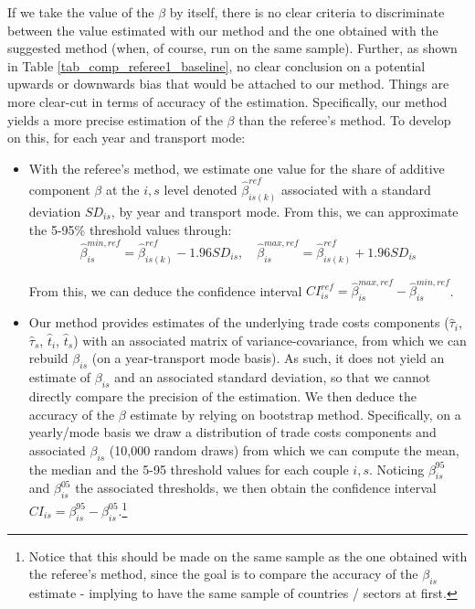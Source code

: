 \documentclass[a4paper,11pt]{article}
\begin{document}
\begin{itemize}
If we take the value of the $\beta$ by itself, there is no clear criteria to discriminate between the value estimated with our method and the one obtained with the suggested method (when, of course, run on the same sample). Further, as shown in Table \ref{tab_comp_referee1_baseline}, no clear conclusion on a potential upwards or downwards bias that would be attached to our method. Things are more clear-cut in terms of accuracy of the estimation. Specifically, our method yields a more precise estimation of the $\beta$ than the referee's method. To develop on this, for each year and transport mode:
    \begin{itemize}
    \item With the referee's method, we estimate one value for the share of additive component $\beta$ at the $i,s$ level denoted $\hat{\beta}^{ref}_{is(k)}$ associated with a standard deviation $SD_{is}$, by year and transport mode. From this, we can approximate the 5-95\% threshold values through:
        $$\hat{\beta}_{is}^{min,ref} = \hat{\beta}^{ref}_{is(k)} - 1.96 SD_{is},\quad \hat{\beta}_{is}^{max,ref} = \hat{\beta}^{ref}_{is(k)} + 1.96 SD_{is}$$

        From this, we can deduce the confidence interval $CI^{ref}_{is} = \hat{\beta}_{is}^{max,ref} - \hat{\beta}_{is}^{min,ref}$.

        \item  Our method provides estimates of the underlying trade costs components ($\widehat{\tau}_i$, $\widehat{\tau}_s$, $\widehat{t}_i$, $\widehat{t}_s$) with an associated matrix of variance-covariance, from which we can rebuild $\beta_{is}$ (on a year-transport mode basis). As such, it does not yield an estimate of $\beta_{is}$ and an associated standard deviation, so that we cannot directly compare the precision of the estimation. We then deduce the accuracy of the $\beta$ estimate by relying on bootstrap method. Specifically, on a yearly/mode basis we draw a distribution of trade costs components and associated $\beta_{is}$ (10,000 random draws) from which we can compute the mean, the median and the 5-95 threshold values for each couple $i,s$. Noticing $\beta_{is}^{95}$ and $\beta_{is}^{05}$ the associated thresholds, we then obtain the confidence interval $CI_{is}= \beta_{is}^{95}- \beta_{is}^{05}$.\footnote{Notice that this should be made on the same sample as the one obtained with the referee's method, since the goal is to compare the accuracy of the $\beta_{is}$ estimate - implying to have the same sample of countries / sectors at first. }




\end{itemize}
\end{itemize}
\end{document}
